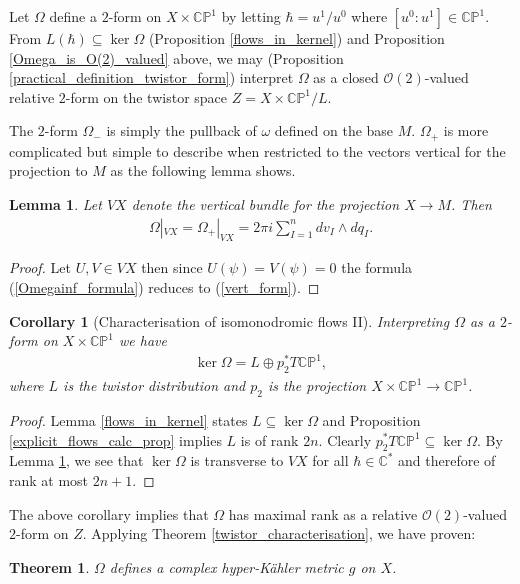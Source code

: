 \documentclass[a4paper,12pt,reqno]{amsart}
\newcounter{counter2}
\numberwithin{equation}{section}
\numberwithin{counter2}{section}
\newcounter{counter3}
\newtheorem{thm}[counter2]{Theorem}
\newtheorem{lemma}[counter2]{Lemma}
\newtheorem{cor}[counter2]{Corollary}
\begin{document}
Let $\Omega$ define a $2$-form on $X \times \mathbb{CP}^1$ by letting $\hbar = u^1/u^0$ where $[u^0:u^1] \in \mathbb{CP}^1$.  From $L(\hbar) \subseteq \ker \Omega$ (Proposition \ref{flows_in_kernel}) and Proposition \ref{Omega_is_O(2)_valued} above,  we may (Proposition \ref{practical_definition_twistor_form}) interpret $\Omega$ as a closed $\mathcal{O}(2)$-valued relative $2$-form on the twistor space $Z = X \times \mathbb{CP}^1 / L$.  \par 
The $2$-form $\Omega_{-}$ is simply the pullback of $\omega$ defined on the base $M$.  $\Omega_{+}$ is more complicated but simple to describe when restricted to the vectors vertical for the projection to $M$ as the following lemma shows.  
\begin{lemma}\label{vertical_symplectic_form}
Let $VX$ denote the vertical bundle for the projection $X \to M$.  Then 
\begin{align}\label{vert_form}
\Omega|_{VX} = \Omega_{+}|_{VX} = 2\pi i\sum_{I=1}^{n} dv_I \wedge dq_I.  
\end{align}
\end{lemma}
\begin{proof}
Let $U,V \in VX$ then since $U(\psi) = V(\psi) = 0$ the formula (\ref{Omegainf_formula}) reduces to (\ref{vert_form}).  
\end{proof}

\begin{cor}[Characterisation of isomonodromic flows II]
Interpreting $\Omega$ as a $2$-form on $X \times \mathbb{CP}^1$ we have 
\begin{align}
\operatorname{ker} \Omega = L \oplus p_2^*T\mathbb{CP}^1,  
\end{align}
where $L$ is the twistor distribution and $p_2$ is the projection $X \times \mathbb{CP}^1  \to \mathbb{CP}^1$.  
\end{cor}
\begin{proof}
Lemma \ref{flows_in_kernel} states $L \subseteq \operatorname{ker} \Omega$ and Proposition \ref{explicit_flows_calc_prop} implies $L$ is of rank $2n$.  Clearly $p_2^*T\mathbb{CP}^1  \subseteq \ker \Omega$.  
By Lemma \ref{vertical_symplectic_form},  we see that $ \ker \Omega$ is transverse to $VX$ for all $\hbar \in \mathbb{C}^*$ and therefore of rank at most $2n+1$.  
\end{proof}
The above corollary implies that $\Omega$ has maximal rank as a relative $\mathcal{O}(2)$-valued $2$-form on $Z$.  Applying Theorem \ref{twistor_characterisation},  we have proven:
\begin{thm}
$\Omega$ defines a complex hyper-K\"ahler metric $g$ on $X$.  
\end{thm}
\end{document}

